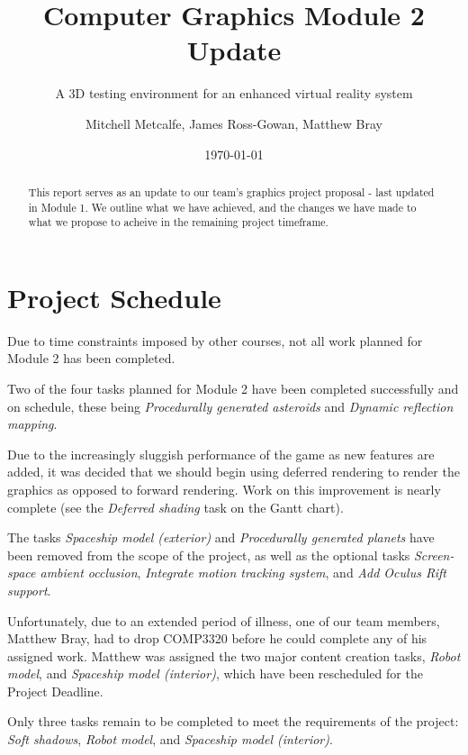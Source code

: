 \documentclass[11pt]{scrartcl} %
\title{Computer Graphics Module 2 Update}
\subtitle{A 3D testing environment for an enhanced virtual reality system}
\author{ Mitchell Metcalfe, James Ross-Gowan, Matthew Bray }
\date{\today} %
\newcommand{\taskname}[1]{{\textit{#1}}}
\begin{document}
\maketitle

\begin{abstract}

    This report serves as an update to our team's graphics project proposal -
    last updated in Module 1.  We outline what we have achieved, and the
    changes we have made to what we propose to acheive in the remaining project
    timeframe.

\end{abstract}

\section*{Project Schedule}
    
    Due to time constraints imposed by other courses, not all work planned for Module 2 has been completed.

    Two of the four tasks planned for Module 2 have been completed successfully and on schedule, these being \taskname{Procedurally generated asteroids} and 
    \taskname{Dynamic reflection mapping}.

    Due to the increasingly sluggish performance of the game as new features are added, it was decided that we should begin using deferred rendering to render the graphics as opposed to forward rendering. Work on this improvement is nearly complete (see the \taskname{Deferred shading} task on the Gantt chart).

    The tasks \taskname{Spaceship model (exterior)} and \taskname{Procedurally
    generated planets} have been removed from the scope of the project, as well
    as the optional tasks \taskname{Screen-space ambient occlusion},
    \taskname{Integrate motion tracking system}, and \taskname{Add Oculus Rift
    support}.

    Unfortunately, due to an extended period of illness, one of our team
    members, Matthew Bray, had to drop COMP3320 before he could complete any of
    his assigned work.
    Matthew was assigned the two major content creation tasks, \taskname{Robot model}, and \taskname{Spaceship model (interior)},
    which have been rescheduled for the Project Deadline.

    Only three tasks remain to be completed to meet the requirements of the
    project: \taskname{Soft shadows}, \taskname{Robot model}, and
    \taskname{Spaceship model (interior)}.
\end{document}
